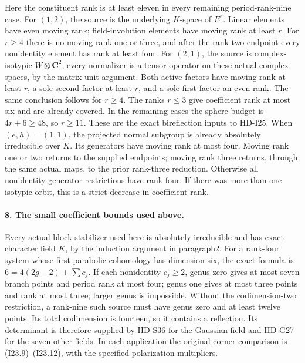 Here the constituent rank is at least eleven in every remaining
period-rank-nine case. For \((1,2)\), the source is the underlying
\(K\)-space of \(E^r\). Linear elements have even moving rank;
field-involution elements have moving rank at least \(r\).
For \(r\ge4\) there is no moving rank one or three, and after
the rank-two endpoint every nonidentity element has rank at least
four. For \((2,1)\), the source is complex-isotypic
\(W\otimes\mathbf C^2\); every normalizer is a tensor operator
on these actual complex spaces, by the matrix-unit argument.
Both active factors have moving rank at least \(r\), a sole
second factor at least \(r\), and a sole first factor an even
rank. The same conclusion follows for \(r\ge4\).
The ranks \(r\le3\) give coefficient rank at most six and
are already covered. In the remaining cases the sphere budget
is \(4r+6\ge48\), so \(r\ge11\).
These are the exact bireflection inputs to HD-I25. When
\((e,h)=(1,1)\), the projected normal subgroup is already
absolutely irreducible over \(K\). Its generators have moving
rank at most four. Moving rank one or two returns to the supplied
endpoints; moving rank three returns, through the same actual
maps, to the prior rank-three reduction. Otherwise all nonidentity
generator restrictions have rank four. If there was more than one
isotypic orbit, this is a strict decrease in coefficient rank.

\paragraph{8. The small coefficient bounds used above.}
Every actual block stabilizer used here is absolutely irreducible
and has exact character field \(K\), by the induction argument
in paragraph2. For a rank-four system whose first parabolic
cohomology has dimension six, the exact formula is
\(6=4(2g-2)+\sum c_j\). If each nonidentity \(c_j\ge2\),
genus zero gives at most seven branch points and period rank
at most four; genus one gives at most three points and rank
at most three; larger genus is impossible. Without the
codimension-two restriction, a rank-nine such source must have
genus zero and at least twelve points. Its total codimension
is fourteen, so it contains a reflection. Its determinant is
therefore supplied by HD-S36 for the Gaussian field and
HD-G27 for the seven other fields. In each application the
original corner comparison is (I23.9)--(I23.12), with the
specified polarization multipliers.
